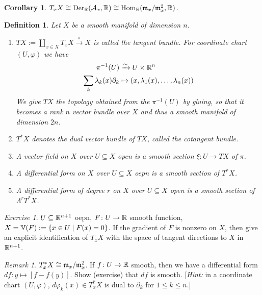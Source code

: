 \documentclass[A4paper, british, reqno]{amsart}
\theoremstyle{darkgreentheorem}
\newtheorem{cor}[thm]{Corollary}
\theoremstyle{darkbluedefinition}
\newtheorem{defn}[thm]{Definition}
\theoremstyle{darkredexample}
\theoremstyle{remark}
\newtheorem{rem}[thm]{Remark}
\newtheorem{exe}[thm]{Exercise}
\DeclareMathOperator{\Hom}{Hom}
\DeclareMathOperator{\Der}{Der}
\newcommand{\1}{\mathbbm{1}}
\newcommand{\tms}{\times}
\newcommand{\sub}{\subseteq}
\begin{document}
\begin{cor}
    $T_{x}X\cong \Der_{\R}(\calA_{x},\R)\cong \Hom_{\R}(\m_{x}/\m_{x}^{2},\R)$.
\end{cor}

\begin{defn}
    Let $X$ be a smooth manifold of dimension $n$.
    \begin{enumerate}
	\item $TX:=\coprod_{x\in X}T_{x}X\xrightarrow{\pi}X$ is called the \textit{tangent bundle}.
	    For coordinate chart $(U,\varphi)$ we have
	    \begin{align*}
		\pi^{-1}(U)&\xrightarrow{\sim} U\tms \R^{n}\\
		\sum_{k}\lambda_{k}(x)\partial_{k}&\mapsto (x,\lambda_{1}(x),\ldots,\lambda_{n}(x))
	    \end{align*}
	    We give $TX$ the topology obtained from the $\pi^{-1}(U)$ by gluing, so that it becomes a rank $n$ vector bundle over $X$ and thus a smooth manifold of dimension $2n$.
	\item $T^{*}X$ denotes the dual vector bundle of $TX$, called the \textit{cotangent bundle}.
	\item A \textit{vector field} on $X$ over $U\sub X$ open is a smooth section $\xi\colon U\to TX$ of $\pi$.
	\item A \textit{differential form} on $X$ over $U\sub X$ oepn is a smooth section of $T^{*}X$.
	\item A \textit{differential form} of degree $r$ on $X$ over $U\sub X$ open is a smooth section of $\Lambda^{r}T^{*}X$.
    \end{enumerate}
\end{defn}

\begin{exe}
    $U\sub \R^{n+1}$ oepn, $F\colon U\to \mathbb{R}$ smooth function, $X=\mathbb{V}(F):=\{ x\in U\mid F(x)=0\}$.
    If the gradient of $F$ is nonzero on $X$, then give an explicit identification of $T_{x}X$ with the space of tangent directions to $X$ in $\mathbb{R}^{n+1}$.
\end{exe}

\begin{rem}
    $T_{x}^{*}X\cong \mathfrak{m}_{x}/\mathfrak{m}_{x}^{2}$.
    If $f\colon U\to \mathbb{R}$ smooth, then we have a differential form $df\colon y\mapsto [f-f(y)]$.
    Show (exercise) that $df$ is smooth.
    [\textit{Hint:} in a coordinate chart $(U,\varphi)$, $d\varphi_{k}(x)\in T_{x}^{*}X$ is dual to $\partial_{k}$ for $1\leqslant k\leqslant n$.]
\end{rem}
\end{document}

